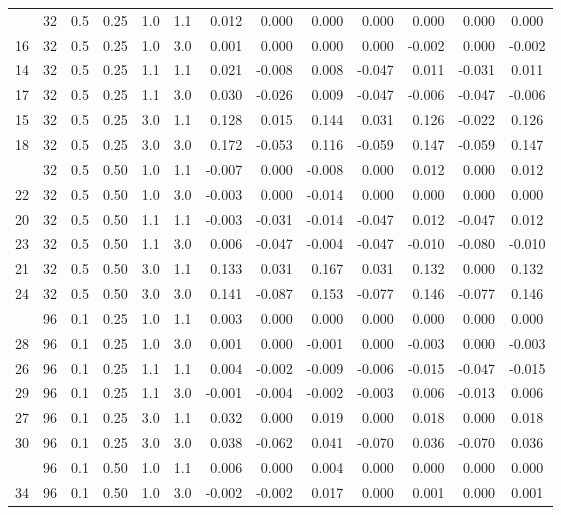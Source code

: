 \begin{longtable}[t]{ccccccrrrrrrc}
\addlinespace
13 & 32 & 0.5 & 0.25 & 1.0 & 1.1 & 0.012 & 0.000 & 0.000 & 0.000 & 0.000 & 0.000 & 0.000\\
16 & 32 & 0.5 & 0.25 & 1.0 & 3.0 & 0.001 & 0.000 & 0.000 & 0.000 & -0.002 & 0.000 & -0.002\\
14 & 32 & 0.5 & 0.25 & 1.1 & 1.1 & 0.021 & -0.008 & 0.008 & -0.047 & 0.011 & -0.031 & 0.011\\
17 & 32 & 0.5 & 0.25 & 1.1 & 3.0 & 0.030 & -0.026 & 0.009 & -0.047 & -0.006 & -0.047 & -0.006\\
15 & 32 & 0.5 & 0.25 & 3.0 & 1.1 & 0.128 & 0.015 & 0.144 & 0.031 & 0.126 & -0.022 & 0.126\\
18 & 32 & 0.5 & 0.25 & 3.0 & 3.0 & 0.172 & -0.053 & 0.116 & -0.059 & 0.147 & -0.059 & 0.147\\
\addlinespace
19 & 32 & 0.5 & 0.50 & 1.0 & 1.1 & -0.007 & 0.000 & -0.008 & 0.000 & 0.012 & 0.000 & 0.012\\
22 & 32 & 0.5 & 0.50 & 1.0 & 3.0 & -0.003 & 0.000 & -0.014 & 0.000 & 0.000 & 0.000 & 0.000\\
20 & 32 & 0.5 & 0.50 & 1.1 & 1.1 & -0.003 & -0.031 & -0.014 & -0.047 & 0.012 & -0.047 & 0.012\\
23 & 32 & 0.5 & 0.50 & 1.1 & 3.0 & 0.006 & -0.047 & -0.004 & -0.047 & -0.010 & -0.080 & -0.010\\
21 & 32 & 0.5 & 0.50 & 3.0 & 1.1 & 0.133 & 0.031 & 0.167 & 0.031 & 0.132 & 0.000 & 0.132\\
24 & 32 & 0.5 & 0.50 & 3.0 & 3.0 & 0.141 & -0.087 & 0.153 & -0.077 & 0.146 & -0.077 & 0.146\\
\addlinespace
25 & 96 & 0.1 & 0.25 & 1.0 & 1.1 & 0.003 & 0.000 & 0.000 & 0.000 & 0.000 & 0.000 & 0.000\\
28 & 96 & 0.1 & 0.25 & 1.0 & 3.0 & 0.001 & 0.000 & -0.001 & 0.000 & -0.003 & 0.000 & -0.003\\
26 & 96 & 0.1 & 0.25 & 1.1 & 1.1 & 0.004 & -0.002 & -0.009 & -0.006 & -0.015 & -0.047 & -0.015\\
29 & 96 & 0.1 & 0.25 & 1.1 & 3.0 & -0.001 & -0.004 & -0.002 & -0.003 & 0.006 & -0.013 & 0.006\\
27 & 96 & 0.1 & 0.25 & 3.0 & 1.1 & 0.032 & 0.000 & 0.019 & 0.000 & 0.018 & 0.000 & 0.018\\
30 & 96 & 0.1 & 0.25 & 3.0 & 3.0 & 0.038 & -0.062 & 0.041 & -0.070 & 0.036 & -0.070 & 0.036\\
\addlinespace
31 & 96 & 0.1 & 0.50 & 1.0 & 1.1 & 0.006 & 0.000 & 0.004 & 0.000 & 0.000 & 0.000 & 0.000\\
34 & 96 & 0.1 & 0.50 & 1.0 & 3.0 & -0.002 & -0.002 & 0.017 & 0.000 & 0.001 & 0.000 & 0.001\\

\end{longtable}
